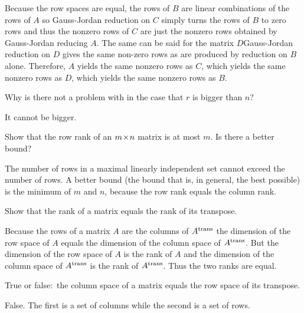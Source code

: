 \begin{exercises}
\begin{answer}
\begin{exparts}
          Because the row spaces are equal, the rows of \( B \)
          are linear combinations of the rows of \( A \) so Gauss-Jordan
          reduction on \( C \) simply turns the rows of \( B \) to zero rows
          and thus the nonzero rows of $C$ are just the nonzero rows obtained
          by Gauss-Jordan reducing \( A \).
          The same can be said for the matrix \( D \)\Dash Gauss-Jordan
          reduction on \( D \) gives the same non-zero rows as are produced
          by reduction on \( B \) alone.
          Therefore, 
          \( A \) yields the same nonzero rows as \( C  \), which yields
          the same nonzero rows as \( D \), which yields the same nonzero
          rows as \( B \).
      \end{exparts}  
    \end{answer}
  \item 
    Why is there not a problem with  
    in the case that \( r \) is bigger than \( n \)?
    \begin{answer}
      It cannot be bigger.  
    \end{answer}
  \item  
    Show that the row rank of an \( m \! \times \! n \) matrix is at most
    \( m \).
    Is there a better bound?
    \begin{answer}
      The number of rows in a maximal linearly independent set cannot
      exceed the number of rows.
      A better bound (the bound that is, in general, the best possible) is
      the minimum of \( m \) and \( n \), because the row rank equals the
      column rank.
     \end{answer}
  \recommended \item
    Show that the rank of a matrix equals the rank of its transpose.
    \begin{answer}
      Because the rows of a matrix \( A \) are the columns
      of \( {{A}^{\rm trans}} \) the dimension of the row space of \( A \) equals
      the dimension of the column space of \( {{A}^{\rm trans}} \).
      But the dimension of the row space of \( A \) is the rank of \( A \) and
      the dimension of the column space of \( {{A}^{\rm trans}} \) is the rank of
      \( {{A}^{\rm trans}} \).
      Thus the two ranks are equal.
    \end{answer}
  \item 
    True or false:~the column space of a matrix equals the row space of its
    transpose.
    \begin{answer}
      False.
      The first is a set of columns while the second is a set of rows.


\end{answer}
\end{exercises}
